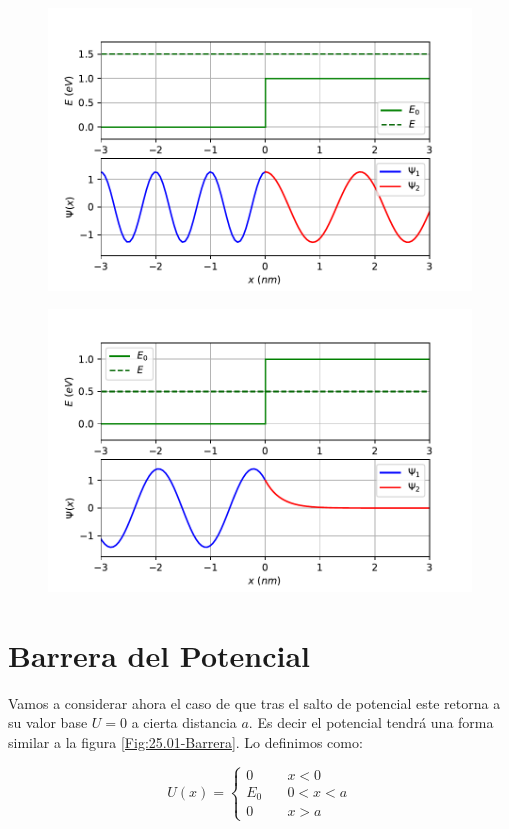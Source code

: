 \documentclass[12pt,a4paper]{article}
\numberwithin{equation}{section}
\numberwithin{figure}{section}
\begin{document}
\begin{figure}[h!] \centering
\includegraphics[scale=0.7]{potencial-escalon2.pdf}
\end{figure}
\begin{figure}[h!] \centering
\includegraphics[scale=0.7]{potencial-escalon1.pdf}
\end{figure}

\section{Barrera del Potencial}

Vamos a considerar ahora el caso de que tras el salto de potencial  este retorna a su valor base $U=0$ a cierta distancia $a$. Es decir el potencial tendrá una forma similar a la  figura \ref{Fig:25.01-Barrera}. Lo definimos como:

\begin{equation}
U(x) = \left\lbrace \begin{array}{ll}
0 & \quad x<0 \\
E_0 & \quad 0 < x < a \\
0 & \quad x > a
\end{array} \right.
\end{equation}
\end{document}
